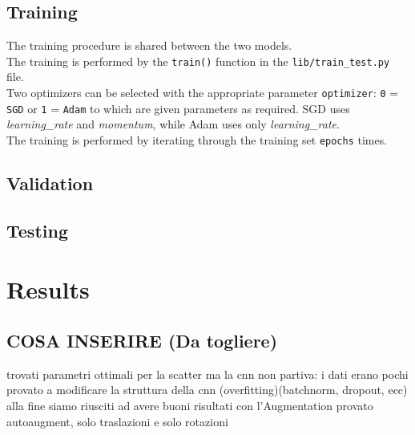 \documentclass{report}
\begin{document}
\section{Training}
The training procedure is shared between the two models. \\
The training is performed by the \texttt{train()} function in the \texttt{lib/train\_test.py} file. \\

Two optimizers can be selected with the appropriate parameter \texttt{optimizer}: \texttt{0} = \texttt{SGD} or \texttt{1} = \texttt{Adam} to which are given parameters
as required. SGD uses \textit{learning\_rate} and \textit{momentum}, while Adam uses only \textit{learning\_rate}. \\
The training is performed by iterating through the training set \texttt{epochs} times. \\


\section{Validation}
\section{Testing}

\chapter{Results}
\section{COSA INSERIRE (Da togliere)}
trovati parametri ottimali per la scatter
ma la cnn non partiva: i dati erano pochi
provato a modificare la struttura della cnn (overfitting)(batchnorm, dropout, ecc)
alla fine siamo riusciti ad avere buoni risultati con l'Augmentation
provato autoaugment, solo traslazioni e solo rotazioni
\end{document}
